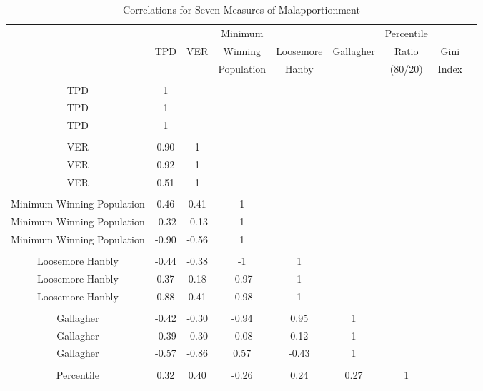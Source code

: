 
\begin{landscape}

\begin{table}[!htbp] \centering 
  \caption{Correlations for Seven Measures of Malapportionment} 
  \label{tab:corr} 
\begin{tabular}{c|c|c|c|c|c|c|c|c}
 &  &  & Minimum &  &  & Percentile & &   \\ 
  & TPD  & VER  & Winning & Loosemore & Gallagher & Ratio & Gini &   \\ 
  &  &  & Population & Hanby &  & (80/20) & Index & \\ 
\hline \\[-1.8ex] 
{TPD} & 1 &  &  &  &  &  &  \\ 
{TPD} & 1 &  &  &  &  &  &  \\ 
{TPD} & 1 &  &  &  &  &  &  \\ 
\hline \\[-1.8ex] 
{VER} & 0.90 & 1 &  &  &  &  &  \\ 
{VER} & 0.92 & 1 &  &  &  &  &  \\ 
{VER} & 0.51 & 1 &  &  &  &  &  \\ 
\hline \\[-1.8ex] 
{Minimum Winning Population} & 0.46 & 0.41 & 1 &  &  &  &  \\ 
{Minimum Winning Population} & -0.32 & -0.13 & 1 &  &  &  &  \\ 
{Minimum Winning Population} & -0.90 & -0.56 & 1 &  &  &  &  \\ 
\hline \\[-1.8ex] 
{Loosemore Hanbly} & -0.44 & -0.38 & -1 & 1 &  &  &  \\ 
{Loosemore Hanbly} & 0.37 & 0.18 & -0.97 & 1 &  &  &  \\ 
{Loosemore Hanbly} & 0.88 & 0.41 & -0.98 & 1 &  &  &  \\ 
\hline \\[-1.8ex] 
{Gallagher} & -0.42 & -0.30 & -0.94 & 0.95 & 1 &  &  \\ 
{Gallagher} & -0.39 & -0.30 & -0.08 & 0.12 & 1 &  &  \\ 
{Gallagher} & -0.57 & -0.86 & 0.57 & -0.43 & 1 &  &  \\ 
\hline \\[-1.8ex] 
{Percentile} & 0.32 & 0.40 & -0.26 & 0.24 & 0.27 & 1 &  \\ 

\end{tabular}
\end{table}
\end{landscape}
